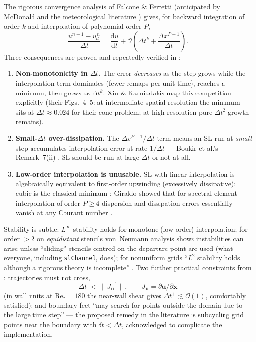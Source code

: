 \documentclass[11pt,a4paper]{article}
\newcommand{\Ret}{\mathrm{Re}_\tau}
\newcommand{\bu}{\mathbf{u}}
\newcommand{\bx}{\mathbf{x}}
\newcommand{\dd}{\mathrm{d}}
\begin{document}
The rigorous convergence analysis of Falcone \& Ferretti \cite{falcone98}
(anticipated by McDonald and the meteorological literature
\cite{staniforth91}) gives, for backward integration of order $k$ and
interpolation of polynomial order $P$,
\begin{equation}
\boxed{\;
\frac{u^{n+1}-u_d^{\,n}}{\Delta t} = \frac{\dd u}{\dd t}
+ \mathcal{O}\!\left(\Delta t^{k}
+ \frac{\Delta x^{P+1}}{\Delta t}\right).
\;}
\label{eq:slerror}
\end{equation}
Three consequences are proved and repeatedly verified in
\cite{xiu01,xu02,xiu05}:
\begin{enumerate}
\item \textbf{Non-monotonicity in $\Delta t$.} The error \emph{decreases} as
the step grows while the interpolation term dominates (fewer remaps per unit
time), reaches a minimum, then grows as $\Delta t^{k}$. Xiu \& Karniadakis
map this competition explicitly (their Figs.~4--5: at intermediate spatial
resolution the minimum sits at $\Delta t\approx0.024$ for their cone problem;
at high resolution pure $\Delta t^2$ growth remains).
\item \textbf{Small-$\Delta t$ over-dissipation.} The $\Delta x^{P+1}/\Delta t$
term means an SL run at \emph{small} step accumulates interpolation error at
rate $1/\Delta t$ --- Boukir et al.'s Remark~7(ii) \cite{boukir97}. SL should
be run at large $\Delta t$ or not at all.
\item \textbf{Low-order interpolation is unusable.} SL with linear
interpolation is algebraically equivalent to first-order upwinding
(excessively dissipative); cubic is the classical minimum
\cite{staniforth91}; Giraldo showed that for spectral-element interpolation
of order $P\ge4$ dispersion and dissipation errors essentially vanish at any
Courant number \cite{giraldo98}.
\end{enumerate}
Stability is subtle: $L^\infty$-stability holds for monotone (low-order)
interpolation; for order $>2$ on \emph{equidistant} stencils von~Neumann
analysis shows instabilities can arise unless ``sliding'' stencils centred on
the departure point are used (what everyone, including \texttt{slChannel},
does); for nonuniform grids ``$L^2$ stability holds although a rigorous
theory is incomplete'' \cite{xiu05}. Two further practical constraints from
\cite{xiu05}: trajectories must not cross,
\begin{equation}
\Delta t \;<\; \big\| J_{\bu}^{-1} \big\|,
\qquad J_{\bu} = \partial \bu/\partial \bx
\label{eq:crossing}
\end{equation}
(in wall units at $\Ret=180$ the near-wall shear gives
$\Delta t^{+}\lesssim \mathcal{O}(1)$, comfortably satisfied); and boundary
feet ``may search for points outside the domain due to the large time step''
--- the proposed remedy in the literature is subcycling grid points near the
boundary with $\delta t<\Delta t$, acknowledged to complicate the
implementation.
\end{document}
